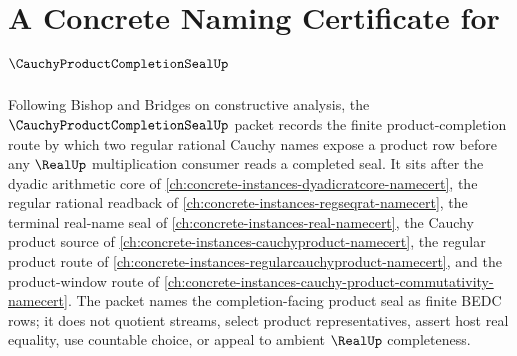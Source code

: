 \chapter{A Concrete Naming Certificate for $\CauchyProductCompletionSealUp$}
\label{ch:concrete-instances-cauchy-product-completion-seal-namecert}

Following Bishop and Bridges on constructive analysis, the $\CauchyProductCompletionSealUp$ packet records the finite product-completion route by which two regular rational Cauchy names expose a product row before any $\RealUp$ multiplication consumer reads a completed seal. It sits after the dyadic arithmetic core of \autoref{ch:concrete-instances-dyadicratcore-namecert}, the regular rational readback of \autoref{ch:concrete-instances-regseqrat-namecert}, the terminal real-name seal of \autoref{ch:concrete-instances-real-namecert}, the Cauchy product source of \autoref{ch:concrete-instances-cauchyproduct-namecert}, the regular product route of \autoref{ch:concrete-instances-regularcauchyproduct-namecert}, and the product-window route of \autoref{ch:concrete-instances-cauchy-product-commutativity-namecert}. The packet names the completion-facing product seal as finite BEDC rows; it does not quotient streams, select product representatives, assert host real equality, use countable choice, or appeal to ambient $\RealUp$ completeness.

